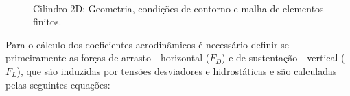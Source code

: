 \documentclass[tese_patricia]{subfiles}%
\begin{document}
\begin{figure}[!htb]
	\centering
	\\
	\caption{Cilindro 2D: Geometria, condições de contorno e malha de elementos finitos.}
\end{figure}

Para o cálculo dos coeficientes aerodinâmicos é necessário definir-se primeiramente as forças de arrasto - horizontal ($F_D$) e de sustentação - vertical ($F_L$), que são induzidas por tensões desviadores e hidrostáticas e são calculadas pelas seguintes equações:
\end{document}
